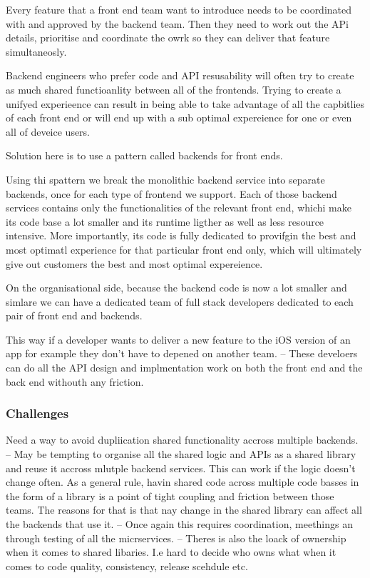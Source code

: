 \documentclass[a4paper, 11pt]{book}
\begin{document}
{    Every feature that a front end team want to introduce needs to be coordinated with and approved by the backend team.
    Then they need to work out the APi details, prioritise and coordinate the owrk so they can deliver that feature simultaneosly.

    Backend engineers who prefer code and API resusability will often try to create as much shared functioanlity between all of the frontends.
    Trying to create a unifyed experieence can result in being able to take advantage of all the capbitlies of each front end or will end up with a sub optimal expereience for one or even all of deveice users.

    Solution here is to use a pattern called backends for front ends.

    Using thi spattern we break the monolithic backend service into separate backends, once for each type of frontend we support.
    Each of those backend services contains only the functionalities of the relevant front end, whichi make its code base a lot smaller and its runtime ligther as well as less resource intensive.
    More importantly, its code is fully dedicated to provifgin the best and most optimatl experience for that particular front end only, which will ultimately give out customers the best and most optimal expereience.

    On the organisational side, because the backend code is now a lot smaller and simlare we can have a dedicated team of full stack developers dedicated to each pair of front end and backends.

    This way if a developer wants to deliver a new feature to the iOS version of an app for example they don't have to depened on another team.
    -- These develoers can do all the API design and implmentation work on both the front end and the back end withouth any friction.

    \subsubsection{Challenges}
    Need a way to avoid dupliication shared functionality accross multiple backends.
    -- May be tempting to organise all the shared logic and APIs as a shared library and reuse it accross mlutple backend services. This can work if the logic doesn't change often.
    As a general rule, havin shared code across multiple code basses in the form of a library is a point of tight coupling and friction between those teams.
    The reasons for that is that nay change in the shared library can affect all the backends that use it.
    -- Once again this requires coordination, meethings an through testing of all the micrservices.
    -- Theres is also the loack of ownership when it comes to shared libaries. I.e hard to decide who owns what when it comes to code quality, consistency, release scehdule etc.

}
\end{document}
